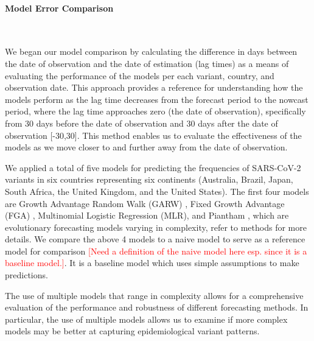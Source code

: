 \documentclass[11pt,oneside,letterpaper]{article}
\def\jhc#1{\textcolor{red}{[#1]}}
\begin{document}
\paragraph{Model Error Comparison}\

We began our model comparison by calculating the difference in days between the date of observation and the date of estimation (lag times) as a means of evaluating the performance of the models per each variant, country, and observation date.
This approach provides a reference for understanding how the models perform as the lag time decreases from the forecast period to the nowcast period, where the lag time approaches zero (the date of observation), specifically from 30 days before the date of observation and 30 days after the date of observation [-30,30].
This method enables us to evaluate the effectiveness of the models as we move closer to and further away from the date of observation.

We applied a total of five models for predicting the frequencies of SARS-CoV-2 variants in six countries representing six continents (Australia, Brazil, Japan, South Africa, the United Kingdom, and the United States).
The first four models are Growth Advantage Random Walk (GARW) \cite{figgins_bedford_freq_dyn}, Fixed Growth Advantage (FGA) \cite{figgins_bedford_freq_dyn}, Multinomial Logistic Regression (MLR), and Piantham \cite{piantham2021estimating}, which are evolutionary forecasting models varying in complexity, refer to methods for more details.
We compare the above 4 models to a naive model to serve as a reference model for comparison \jhc{Need a definition of the naive model here esp. since it is a baseline model.}.
It is a baseline model which uses simple assumptions to make predictions. %

The use of multiple models that range in complexity allows for a comprehensive evaluation of the performance and robustness of different forecasting methods.
In particular, the use of multiple models allows us to examine if more complex models may be better at capturing epidemiological variant patterns.
\end{document}
